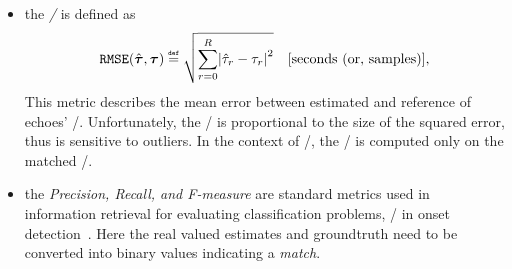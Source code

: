 \begin{itemize}
    \item the \textit{\RMSEtxt/} is defined as
    \begin{equation}
        \RMSE(\hat{\boldsymbol{\tau}}, \boldsymbol{\tau}) \eqdef \sqrt{\sum_{\idxEch=0}^{\numEchs} \abs{\hat{\tau}_\idxEch - \tau_\idxEch}^2} \quad \text{[seconds (or, samples)]}
        ,
    \end{equation}
    This metric describes the mean error between estimated and reference of echoes' \TOAs/.
    Unfortunately, the \RMSEtxt/ is proportional to the size of the squared error, thus is sensitive to outliers.
    In the context of \AER/, the \RMSEtxt/ is computed only on the matched \TOAs/.

    \item the \textit{Precision, Recall, and F-measure} are standard metrics used in information retrieval for evaluating classification problems, \eg/ in onset detection~.
    Here the real valued estimates and groundtruth need to be converted into binary values indicating a \textit{match}.
\end{itemize}
